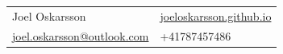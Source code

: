 \documentclass[12pt]{article}
\newcommand{\text}[2]{#2}
\newcommand{\text}[2]{#1}
\begin{document}
\vfill

\center
\begin{tabular}{l l}
    Joel Oskarsson & \href{http://joeloskarsson.github.io}{joeloskarsson.github.io}\\
    \href{mailto:joel.oskarsson@outlook.com}{joel.oskarsson@outlook.com} & +41787457486
\end{tabular}
\end{document}
